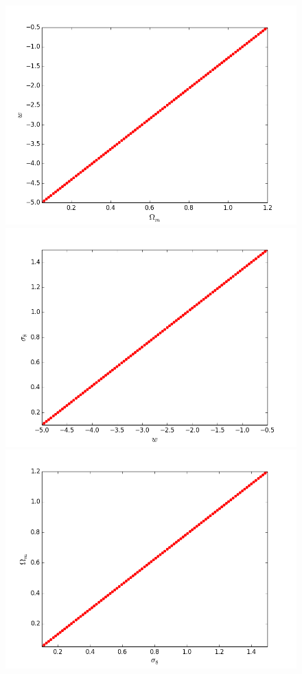 \documentclass[11pt]{article}
\begin{document}
%
\begin{figure}
\begin{center}
\includegraphics[scale=0.25]{Figures/diag1.png}
\includegraphics[scale=0.25]{Figures/diag2.png}
\includegraphics[scale=0.25]{Figures/diag3.png}

\end{center}
\end{figure}
\end{document}

